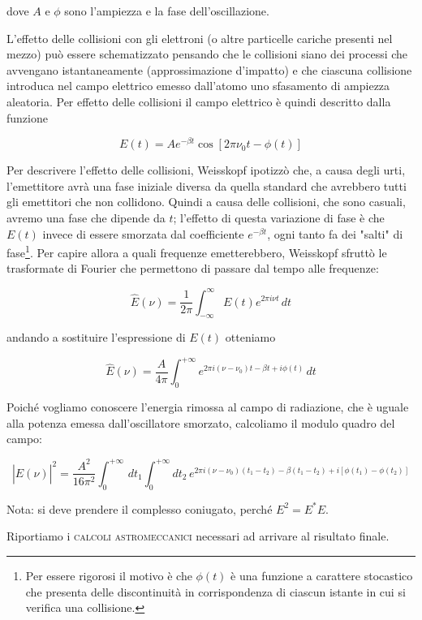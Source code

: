 dove $A$ e $\phi$ sono l'ampiezza e la fase dell'oscillazione.

L'effetto delle collisioni con gli elettroni (o altre particelle cariche presenti nel mezzo) può essere schematizzato pensando che le collisioni siano dei processi che avvengano istantaneamente (approssimazione d'impatto) e che ciascuna collisione introduca nel campo elettrico emesso dall'atomo uno sfasamento di ampiezza aleatoria. Per effetto delle collisioni il campo elettrico è quindi descritto dalla funzione

$$E(t)=Ae^{-\beta t} \cos{[2\pi \nu_0 t - \phi(t)]}$$

Per descrivere l'effetto delle collisioni, Weisskopf ipotizzò che, a causa degli urti, l'emettitore avrà una fase iniziale diversa da quella standard che avrebbero tutti gli emettitori che non collidono. Quindi a causa delle collisioni, che sono casuali, avremo una fase che dipende da $t$; l'effetto di questa variazione di fase è che $E(t)$ invece di essere smorzata dal coefficiente $e^{-\beta t}$, ogni tanto fa dei "salti" di fase\footnote{Per essere rigorosi il motivo è che $\phi(t)$ è una funzione a carattere stocastico che presenta delle discontinuità in corrispondenza di ciascun istante in cui si verifica una collisione.}. Per capire allora a quali frequenze emetterebbero, Weisskopf sfruttò le trasformate di Fourier che permettono di passare dal tempo alle frequenze:

$$\hat{E}(\nu)=\frac{1}{2\pi}\int_{-\infty}^{\infty} E(t) e^{2 \pi i\nu t} \,dt$$

andando a sostituire l'espressione di $E(t)$ otteniamo

$$\hat{E}(\nu)=\frac{A}{4\pi}\int_{0}^{+\infty} e^{2\pi i(\nu-\nu_0)t-\beta t+i \phi(t)}\, dt$$

Poiché vogliamo conoscere l'energia rimossa al campo di radiazione, che è uguale alla potenza emessa dall'oscillatore smorzato, calcoliamo il modulo quadro del campo:

\begin{equation*}
  |\hat{E}(\nu)|^2=\frac{A^2}{16 \pi^2}\int_{0}^{+\infty}\, dt_1 \int_{0}^{+\infty}dt_2 \, e^{2\pi i(\nu-\nu_0)(t_1-t_2)-\beta (t_1-t_2)+i [\phi(t_1)-\phi(t_2)]}
\end{equation*}

Nota: si deve prendere il complesso coniugato, perché $E^2=E^*E$.

\hrulefill

Riportiamo i \textsc{calcoli astromeccanici} necessari ad arrivare al risultato finale.


